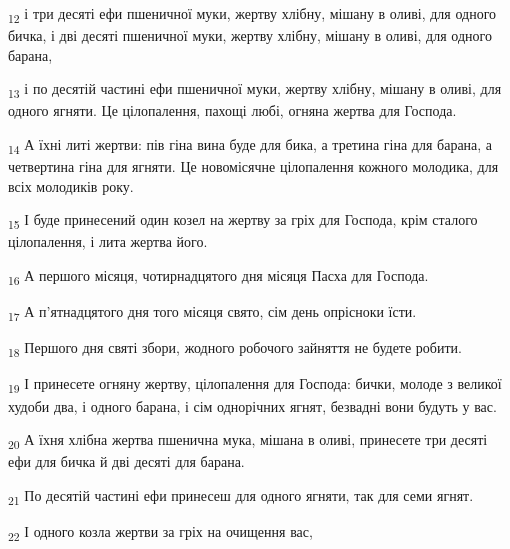 \begin{tcolorbox}
\textsubscript{12} і три десяті ефи пшеничної муки, жертву хлібну, мішану в оливі, для одного бичка, і дві десяті пшеничної муки, жертву хлібну, мішану в оливі, для одного барана,
\end{tcolorbox}
\begin{tcolorbox}
\textsubscript{13} і по десятій частині ефи пшеничної муки, жертву хлібну, мішану в оливі, для одного ягняти. Це цілопалення, пахощі любі, огняна жертва для Господа.
\end{tcolorbox}
\begin{tcolorbox}
\textsubscript{14} А їхні литі жертви: пів гіна вина буде для бика, а третина гіна для барана, а четвертина гіна для ягняти. Це новомісячне цілопалення кожного молодика, для всіх молодиків року.
\end{tcolorbox}
\begin{tcolorbox}
\textsubscript{15} І буде принесений один козел на жертву за гріх для Господа, крім сталого цілопалення, і лита жертва його.
\end{tcolorbox}
\begin{tcolorbox}
\textsubscript{16} А першого місяця, чотирнадцятого дня місяця Пасха для Господа.
\end{tcolorbox}
\begin{tcolorbox}
\textsubscript{17} А п'ятнадцятого дня того місяця свято, сім день опрісноки їсти.
\end{tcolorbox}
\begin{tcolorbox}
\textsubscript{18} Першого дня святі збори, жодного робочого зайняття не будете робити.
\end{tcolorbox}
\begin{tcolorbox}
\textsubscript{19} І принесете огняну жертву, цілопалення для Господа: бички, молоде з великої худоби два, і одного барана, і сім однорічних ягнят, безвадні вони будуть у вас.
\end{tcolorbox}
\begin{tcolorbox}
\textsubscript{20} А їхня хлібна жертва пшенична мука, мішана в оливі, принесете три десяті ефи для бичка й дві десяті для барана.
\end{tcolorbox}
\begin{tcolorbox}
\textsubscript{21} По десятій частині ефи принесеш для одного ягняти, так для семи ягнят.
\end{tcolorbox}
\begin{tcolorbox}
\textsubscript{22} І одного козла жертви за гріх на очищення вас,
\end{tcolorbox}
